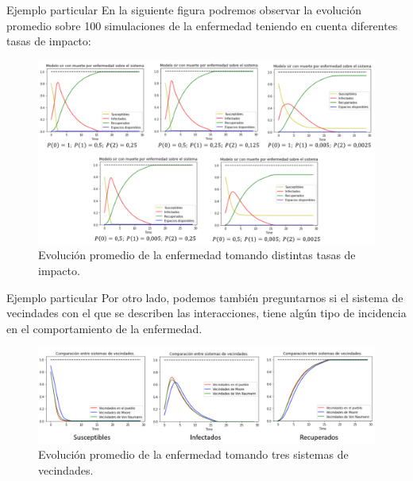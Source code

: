\documentclass[9pt]{beamer}
\begin{document}
\begin{frame}{Ejemplo particular}
En la siguiente figura podremos observar la evolución promedio sobre 100 simulaciones de la enfermedad teniendo en cuenta diferentes tasas de impacto:

\begin{figure}[h]
  \centering
    \includegraphics[width=1\textwidth]{Imagenes/comparacionTasasImpacto.PNG}
    \caption{Evolución promedio de la enfermedad tomando distintas tasas de impacto.}
    \label{fig:comparacionTasasdeImpacto}
\end{figure}
\end{frame}

\begin{frame}{Ejemplo particular}
Por otro lado, podemos también preguntarnos si el sistema de vecindades con el que se describen las interacciones, tiene algún tipo de incidencia en el comportamiento de la enfermedad. %
\begin{figure}[h]
  \centering
    \includegraphics[width=1\textwidth]{Imagenes/comparacionSistemasVecindades.PNG}
    \caption{Evolución promedio de la enfermedad tomando tres sistemas de vecindades.}
    \label{fig:comparacionSistemasDeVecindades}
\end{figure}
\end{frame}
\end{document}

